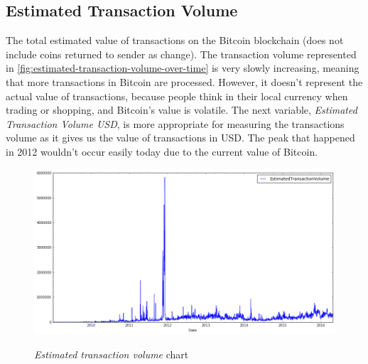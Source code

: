 
\subsection{Estimated Transaction Volume}
\label{sec:estimated-transaction-volume}


The total estimated value of transactions on the Bitcoin blockchain
(does not include coins returned to sender as change). The transaction
volume represented in
\autoref{fig:estimated-transaction-volume-over-time} is very slowly
increasing, meaning that more transactions in Bitcoin are processed.
However, it doesn't represent the actual value of transactions,
because people think in their local currency when trading or shopping,
and Bitcoin's value is volatile. The next variable, \textit{Estimated
  Transaction Volume USD}, is more appropriate for measuring the
transactions volume as it gives us the value of transactions in USD.
The peak that happened in 2012 wouldn't occur easily today due to the
current value of Bitcoin.

\begin{figure}[bth]
  \myfloatalign
  {\includegraphics[width=1\linewidth]
    {gfx/estimated-transaction-volume-over-time}}
  \caption{\textit{Estimated transaction volume} chart}
  \label{fig:estimated-transaction-volume-over-time}
\end{figure}




